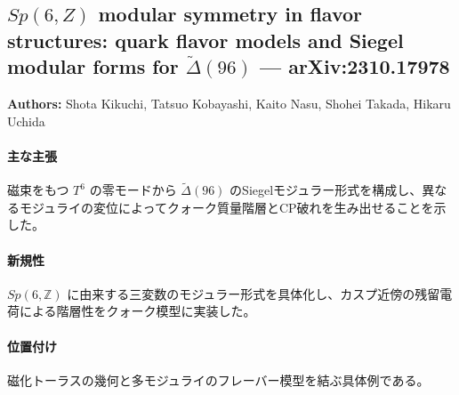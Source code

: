 \subsection{$Sp(6,Z)$ modular symmetry in flavor structures: quark flavor models and Siegel modular forms for $\widetilde{\Delta}(96)$ --- arXiv:2310.17978}

\textbf{Authors:} Shota Kikuchi, Tatsuo Kobayashi, Kaito Nasu, Shohei Takada, Hikaru Uchida

\paragraph{主な主張}
磁束をもつ $T^6$ の零モードから $\widetilde{\Delta}(96)$ のSiegelモジュラー形式を構成し、異なるモジュライの変位によってクォーク質量階層とCP破れを生み出せることを示した\cite{Kikuchi:2023dow}。

\paragraph{新規性}
$Sp(6,\mathbb{Z})$ に由来する三変数のモジュラー形式を具体化し、カスプ近傍の残留電荷による階層性をクォーク模型に実装した。

\paragraph{位置付け}
磁化トーラスの幾何と多モジュライのフレーバー模型を結ぶ具体例である。
